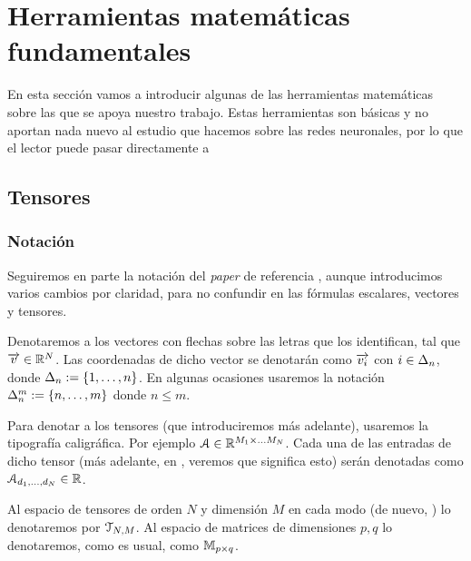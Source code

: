 
\chapter{Herramientas matemáticas fundamentales} \label{ch:matematicas_fundamentales}

En esta sección vamos a introducir algunas de las herramientas matemáticas sobre las que se apoya nuestro trabajo. Estas herramientas son básicas y no aportan nada nuevo al estudio que hacemos sobre las redes neuronales, por lo que el lector puede pasar directamente a 

\section{Tensores}

\subsection{Notación}


Seguiremos en parte la notación del \textit{paper} de referencia \cite{matematicas:principal}, aunque introducimos varios cambios por claridad, para no confundir en las fórmulas escalares, vectores y tensores.

Denotaremos a los vectores con flechas sobre las letras que los identifican, tal que $\overrightarrow{v} \in \mathbb{R}^N$. Las coordenadas de dicho vector se denotarán como $\overrightarrow{v_i}$ con $i \in \Delta_{n}$, donde $\Delta_{n} := \{1, \ldots, n\}$. En algunas ocasiones usaremos la notación $\Delta_{n}^{m} := \{n, \ldots, m\}$ donde $n \leq m$.

Para denotar a los tensores (que introduciremos más adelante), usaremos la tipografía caligráfica. Por ejemplo $\mathcal{A} \in \mathbb{R}^{M_1 \times \ldots M_N}$. Cada una de las entradas de dicho tensor (más adelante, en , veremos que significa esto) serán denotadas como $\mathcal{A}_{d_1, \ldots, d_N} \in \mathbb{R}$.

Al espacio de tensores de orden $N$ y dimensión $M$ en cada modo (de nuevo, ) lo denotaremos por $\mathcal{T}_{N, M}$. Al espacio de matrices de dimensiones $p, q$ lo denotaremos, como es usual, como $\mathbb{M}_{p \times q}$.

